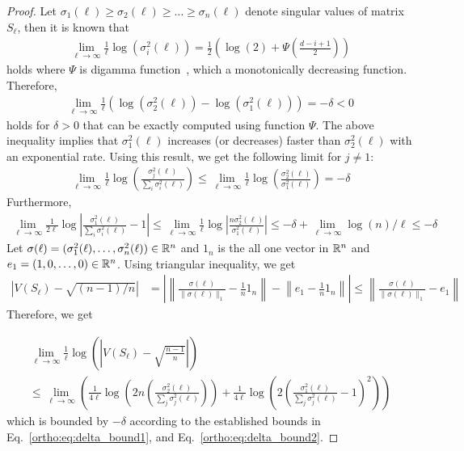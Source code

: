  \begin{proof}
 
 Let $\sigma_1(\ell) \geq \sigma_2(\ell) \geq  \dots \geq  \sigma_n(\ell)$ denote singular values of matrix $S_\ell$, then it is known that 
  \begin{align}
      \lim_{\ell \to \infty} \frac{1}{\ell} \log(\sigma_i^2(\ell)) = \frac{1}{2} \left( \log(2) + \Psi\left(\frac{d-i+1}{2}\right) \right) 
  \end{align}
  holds where $\Psi$ is digamma function~\citep{newman1986distribution}, which a monotonically decreasing function. Therefore, 
  \begin{align} 
       \lim_{\ell \to \infty} \frac{1}{\ell} \left( \log(\sigma_2^2(\ell)) - \log(\sigma^2_1(\ell)) \right)  = - \delta <0 
  \end{align}
  holds for $\delta>0$ that can be exactly computed using function $\Psi$. The above inequality implies that $\sigma_1^2(\ell)$ increases (or decreases) faster than $\sigma_2^2(\ell)$ with an exponential rate. 
  Using this result, we get the following limit for $j\neq 1$:
  \begin{align} \label{ortho:eq:delta_bound1} 
     \lim_{\ell \to \infty} \frac{1}{\ell} \log\left(\frac{\sigma_j^2(\ell)}{\sum_{i} \sigma_i^2(\ell)}\right) \leq \lim_{\ell \to \infty} \frac{1}{\ell} \log\left(\frac{\sigma_2^2(\ell)}{ \sigma_1^2(\ell)}\right) = -\delta
  \end{align}
  Furthermore,
  \begin{align} 
  \label{ortho:eq:delta_bound2}
      \lim_{\ell \to \infty} \frac{1}{2\ell} \log\left|\frac{\sigma_1^2(\ell)}{\sum_{i} \sigma_i^2(\ell)} - 1\right| 
       \leq \lim_{\ell \to \infty} \frac{1}{\ell} \log\left|\frac{n \sigma_2^2(\ell) }{ \sigma_1^2(\ell)}\right| \leq -\delta + \lim_{\ell \to \infty} \log(n)/\ell \leq -\delta 
  \end{align}
  Let $\sigma(\ell) = (\sigma_1^2(\ell), \dots, \sigma_n^2(\ell)) \in \mathbb{R}^n$ and $1_n$ is the all one vector in $\mathbb{R}^n$ and $e_1 = (1,0, \dots, 0)\in \mathbb{R}^n$.
  Using triangular inequality, we get
  \begin{align}
      \left| V(S_\ell) -  \sqrt{(n-1)/n} \right| & = \left|  \left\| \frac{\sigma(\ell)}{\| \sigma(\ell)  \|_1 }- \frac{1}{n} 1_n \right\| - \left\| e_1 -  \frac{1}{n} 1_n  \right\|    \right|  \leq \left\| \frac{\sigma(\ell)}{\| \sigma(\ell)  \|_1} - e_1 \right\| 
  \end{align}
  Therefore, we get
 
   \begin{multline}
      \lim_{\ell \to \infty} \frac{1}{\ell} \log\left( \left|V(S_\ell)-\sqrt{\frac{n-1}{n}}\right|\right) \\ \leq 
      \lim_{\ell \to \infty} \left( \frac{1}{4\ell} \log \left( 2n \left(\frac{\sigma_2^2(\ell)}{\sum_{j} \sigma_j^2(\ell)} \right)  \right) + \frac{1}{4\ell} \log\left(2  \left( \frac{\sigma_1^2(\ell)}{\sum_{j} \sigma_j^2(\ell)} - 1 \right)^2 \right)\right)
   \end{multline}
  which is bounded by $-\delta$ according to the established bounds in Eq.~\eqref{ortho:eq:delta_bound1}, and Eq.~\eqref{ortho:eq:delta_bound2}. 
  \end{proof}
 
